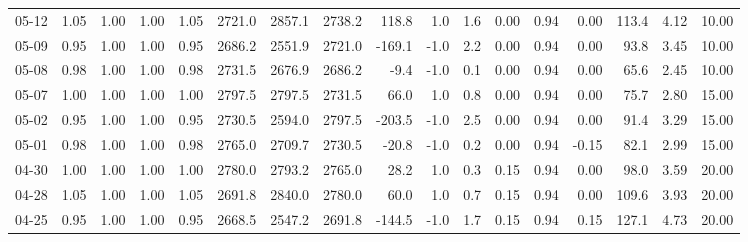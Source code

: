 \begin{threeparttable}
{\begin{tabular}{lrrrrrrrrrrrrrrrr}
  05-12 &         1.05 &           1.00 &          1.00 &          1.05 & 2721.0 & 2857.1 & 2738.2 &      118.8 &                      1.0 &                 1.6 &       0.00 &      0.94 &           0.00 &            113.4 &            4.12 &                  10.00 \\
  05-09 &         0.95 &           1.00 &          1.00 &          0.95 & 2686.2 & 2551.9 & 2721.0 &     -169.1 &                     -1.0 &                 2.2 &       0.00 &      0.94 &           0.00 &             93.8 &            3.45 &                  10.00 \\
  05-08 &         0.98 &           1.00 &          1.00 &          0.98 & 2731.5 & 2676.9 & 2686.2 &       -9.4 &                     -1.0 &                 0.1 &       0.00 &      0.94 &           0.00 &             65.6 &            2.45 &                  10.00 \\
  05-07 &         1.00 &           1.00 &          1.00 &          1.00 & 2797.5 & 2797.5 & 2731.5 &       66.0 &                      1.0 &                 0.8 &       0.00 &      0.94 &           0.00 &             75.7 &            2.80 &                  15.00 \\
  05-02 &         0.95 &           1.00 &          1.00 &          0.95 & 2730.5 & 2594.0 & 2797.5 &     -203.5 &                     -1.0 &                 2.5 &       0.00 &      0.94 &           0.00 &             91.4 &            3.29 &                  15.00 \\
  05-01 &         0.98 &           1.00 &          1.00 &          0.98 & 2765.0 & 2709.7 & 2730.5 &      -20.8 &                     -1.0 &                 0.2 &       0.00 &      0.94 &          -0.15 &             82.1 &            2.99 &                  15.00 \\
  04-30 &         1.00 &           1.00 &          1.00 &          1.00 & 2780.0 & 2793.2 & 2765.0 &       28.2 &                      1.0 &                 0.3 &       0.15 &      0.94 &           0.00 &             98.0 &            3.59 &                  20.00 \\
  04-28 &         1.05 &           1.00 &          1.00 &          1.05 & 2691.8 & 2840.0 & 2780.0 &       60.0 &                      1.0 &                 0.7 &       0.15 &      0.94 &           0.00 &            109.6 &            3.93 &                  20.00 \\
  04-25 &         0.95 &           1.00 &          1.00 &          0.95 & 2668.5 & 2547.2 & 2691.8 &     -144.5 &                     -1.0 &                 1.7 &       0.15 &      0.94 &           0.15 &            127.1 &            4.73 &                  20.00 \\

\end{tabular}}
\end{threeparttable}
